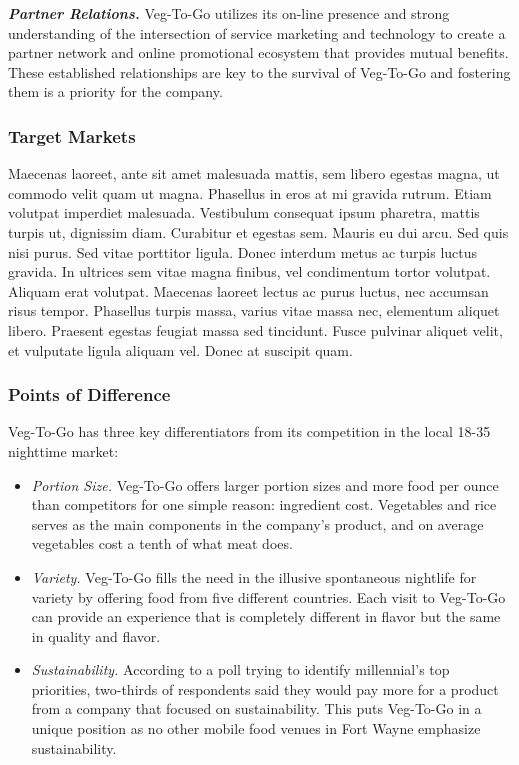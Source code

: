 \documentclass[12pt, letterpaper]{article}
\newcommand{\companyname}{Veg-To-Go}
\begin{document}
\textbf{\emph{Partner Relations.}} \companyname{} utilizes its on-line presence and strong understanding of the intersection of service marketing and technology to create a partner network and online promotional ecosystem that provides mutual benefits. These established relationships are key to the survival of \companyname{} and fostering them is a priority for the company.

\subsubsection{Target Markets}
Maecenas laoreet, ante sit amet malesuada mattis, sem libero egestas magna, ut commodo velit quam ut magna. Phasellus in eros at mi gravida rutrum. Etiam volutpat imperdiet malesuada. Vestibulum consequat ipsum pharetra, mattis turpis ut, dignissim diam. Curabitur et egestas sem. Mauris eu dui arcu. Sed quis nisi purus. Sed vitae porttitor ligula. Donec interdum metus ac turpis luctus gravida. In ultrices sem vitae magna finibus, vel condimentum tortor volutpat. Aliquam erat volutpat. Maecenas laoreet lectus ac purus luctus, nec accumsan risus tempor. Phasellus turpis massa, varius vitae massa nec, elementum aliquet libero. Praesent egestas feugiat massa sed tincidunt. Fusce pulvinar aliquet velit, et vulputate ligula aliquam vel. Donec at suscipit quam.

\subsubsection{Points of Difference}
\companyname{} has three key differentiators from its competition in the local 18-35 nighttime market:

\begin{itemize}
	\item \emph{Portion Size.}  \companyname{} offers larger portion sizes and more food per ounce than competitors for one simple reason: ingredient cost.  Vegetables and rice serves as the main components in the company's product, and on average vegetables cost a tenth of what meat does. \cite{costs}
	\item \emph{Variety.} \companyname{} fills the need in the illusive spontaneous nightlife for variety by offering food from five different countries.  Each visit to \companyname{} can provide an experience that is completely different in flavor but the same in quality and flavor.
	\item \emph{Sustainability.} According to a poll trying to identify millennial's top priorities, two-thirds of respondents said they would pay more for a product from a company that focused on sustainability. \cite{millennials} This puts \companyname{} in a unique position as no other mobile food venues in Fort Wayne emphasize sustainability.
\end{itemize}
\end{document}
